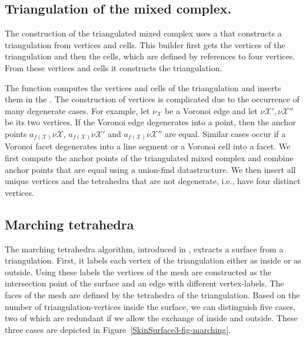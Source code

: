 \subsection{Triangulation of the mixed complex.}
The construction of the triangulated mixed complex uses a
 that constructs a
triangulation from vertices and cells. This builder first gets the
vertices of the triangulation and then the cells, which are defined by
references to four vertices. From these vertices and cells it
constructs the triangulation.

The function  computes the vertices
and cells of the triangulation and inserts them in the
. The construction of
vertices is complicated due to the occurrence of many degenerate
cases.  For example, let $\nu_{\mathcal{X}}$ be a Voronoi edge and
let $\nu{\mathcal{X}'}, \nu{\mathcal{X}''}$ be its two vertices.
If the Voronoi edge degenerates into a point, then the anchor points
$a_{f({\mathcal{X}})}{\nu{\mathcal{X}}}$,
$a_{f({\mathcal{X}})}{\nu{\mathcal{X}'}}$ and
$a_{f({\mathcal{X}})}{\nu{\mathcal{X}''}}$ are equal. Similar
cases occur if a Voronoi facet degenerates into a line segment or a
Voronoi cell into a facet. We first compute the anchor points of the
triangulated mixed complex and combine anchor points that are equal
using a union-find datastructure. We then insert all unique vertices
and the tetrahedra that are not degenerate, i.e., have four distinct
vertices.




\subsection{Marching tetrahedra}
The marching tetrahedra algorithm, introduced in
\cite{cgal:tpg-rmtiise-99}, extracts a surface from a triangulation.
First, it labels each vertex of the triangulation either as inside or
as outside. Using these labels the vertices of the mesh are
constructed as the intersection point of the surface and an edge with
different vertex-labels. The faces of the mesh are defined by the
tetrahedra of the triangulation. Based on the number of
triangulation-vertices inside the surface, we can distinguish five
cases, two of which are redundant if we allow the exchange of inside
and outside. These three cases are depicted in
Figure~\ref{SkinSurface3-fig-marching}.

